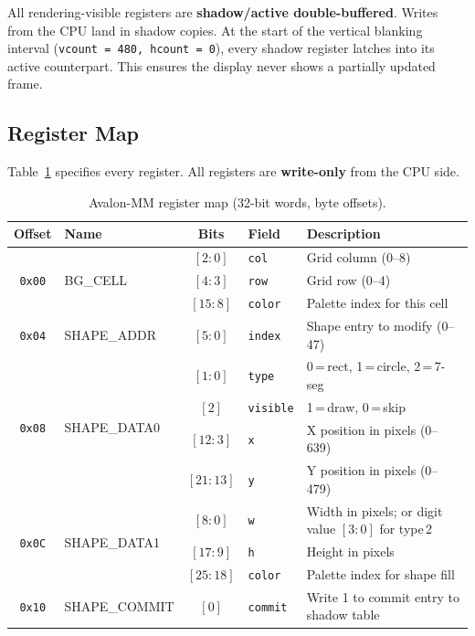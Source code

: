 \documentclass[11pt,letterpaper]{article}
\begin{document}
All rendering-visible registers are \textbf{shadow/active
double-buffered}. Writes from the CPU land in shadow copies. At the
start of the vertical blanking interval (\texttt{vcount\,=\,480,
hcount\,=\,0}), every shadow register latches into its active
counterpart. This ensures the display never shows a partially updated
frame.

\subsection{Register Map}

Table~\ref{tab:regmap} specifies every register. All registers are
\textbf{write-only} from the CPU side.

\begin{table}[H]
\centering
\caption{Avalon-MM register map (32-bit words, byte offsets).}
\label{tab:regmap}
\small
\begin{tabular}{c l c l l}
\toprule
\textbf{Offset} & \textbf{Name} & \textbf{Bits} & \textbf{Field} & \textbf{Description} \\
\midrule
\multirow{3}{*}{\texttt{0x00}}
  & \multirow{3}{*}{BG\_CELL}
  & $[2{:}0]$   & \texttt{col}   & Grid column (0--8) \\
  & & $[4{:}3]$   & \texttt{row}   & Grid row (0--4) \\
  & & $[15{:}8]$  & \texttt{color} & Palette index for this cell \\
\midrule
\texttt{0x04}
  & SHAPE\_ADDR
  & $[5{:}0]$   & \texttt{index} & Shape entry to modify (0--47) \\
\midrule
\multirow{4}{*}{\texttt{0x08}}
  & \multirow{4}{*}{SHAPE\_DATA0}
  & $[1{:}0]$   & \texttt{type}    & 0\,=\,rect, 1\,=\,circle, 2\,=\,7-seg \\
  & & $[2]$       & \texttt{visible} & 1\,=\,draw, 0\,=\,skip \\
  & & $[12{:}3]$  & \texttt{x}       & X position in pixels (0--639) \\
  & & $[21{:}13]$ & \texttt{y}       & Y position in pixels (0--479) \\
\midrule
\multirow{3}{*}{\texttt{0x0C}}
  & \multirow{3}{*}{SHAPE\_DATA1}
  & $[8{:}0]$   & \texttt{w}     & Width in pixels; or digit value $[3{:}0]$ for type\,2 \\
  & & $[17{:}9]$  & \texttt{h}     & Height in pixels \\
  & & $[25{:}18]$ & \texttt{color} & Palette index for shape fill \\
\midrule
\texttt{0x10}
  & SHAPE\_COMMIT
  & $[0]$       & \texttt{commit}& Write 1 to commit entry to shadow table \\
\bottomrule
\end{tabular}
\end{table}
\end{document}
